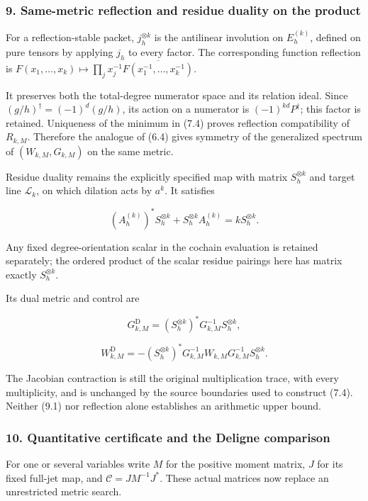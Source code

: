 \subsubsection{9. Same-metric reflection and residue duality on the
product}\label{pr_14:same-metric-reflection-and-residue-duality-on-the-product}

For a reflection-stable packet, \(j_h^{\otimes k}\) is the antilinear
involution on \(E_h^{(k)}\), defined on pure tensors by applying \(j_h\)
to every factor. The corresponding function reflection is
\(F(x_1,\ldots,x_k)\mapsto\prod_jx_j^{-1}\overline{F(x_1^{-1},\ldots,x_k^{-1})}\).

It preserves both the total-degree numerator space and its relation
ideal. Since \((g/h)^\dagger=(-1)^d(g/h)\), its action on a numerator is
\((-1)^{kd}P^\dagger\); this factor is retained. Uniqueness of the
minimum in (7.4) proves reflection compatibility of \(R_{k,M}\).
Therefore the analogue of (6.4) gives symmetry of the generalized
spectrum of \((W_{k,M},G_{k,M})\) on the same metric.

Residue duality remains the explicitly specified map with matrix
\(S_h^{\otimes k}\) and target line \(\mathcal L_k\), on which dilation
acts by \(a^k\). It satisfies

\[(A_h^{(k)})^*S_h^{\otimes k}+S_h^{\otimes k}A_h^{(k)}=kS_h^{\otimes k}.\]

Any fixed degree-orientation scalar in the cochain evaluation is
retained separately; the ordered product of the scalar residue pairings
here has matrix exactly \(S_h^{\otimes k}\).

Its dual metric and control are

\[G_{k,M}^{\mathrm D}=(S_h^{\otimes k})^*G_{k,M}^{-1}S_h^{\otimes k},\]

\[W_{k,M}^{\mathrm D}=-(S_h^{\otimes k})^*G_{k,M}^{-1}W_{k,M}G_{k,M}^{-1}S_h^{\otimes k}.\tag{9.1}\]

The Jacobian contraction is still the original multiplication trace,
with every multiplicity, and is unchanged by the source boundaries used
to construct (7.4). Neither (9.1) nor reflection alone establishes an
arithmetic upper bound.

\subsubsection{10. Quantitative certificate and the Deligne
comparison}\label{pr_14:quantitative-certificate-and-the-deligne-comparison}

For one or several variables write \(M\) for the positive moment matrix,
\(J\) for its fixed full-jet map, and \(\mathcal C=JM^{-1}J^*\). These
actual matrices now replace an unrestricted metric search.


